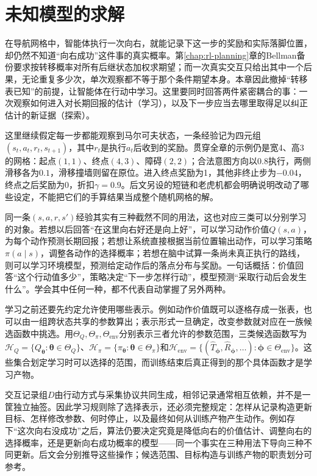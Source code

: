 \chapter{未知模型的求解}
\label{chap:rl-learning}

在导航网格中，智能体执行一次向右，就能记录下这一步的奖励和实际落脚位置，却仍然不知道“向右成功”这件事的真实概率。第\ref{chap:rl-planning}章的Bellman备份要求按转移概率对所有后继状态加权求期望；而一次真实交互只给出其中一个后果，无论重复多少次，单次观察都不等于那个条件期望本身。本章因此撤掉“转移表已知”的前提，让智能体在行动中学习。这里要同时回答两件紧密耦合的事：一次观察如何进入对长期回报的估计（学习），以及下一步应当去哪里取得足以纠正估计的新证据（探索）。

这里继续假定每一步都能观察到马尔可夫状态，一条经验记为四元组
$(s_t,a_t,r_t,s_{t+1})$，其中$r_t$是执行$a_t$后收到的奖励。贯穿全章的示例仍是宽4、高3的网格：起点$(1,1)$、终点$(4,3)$、障碍$(2,2)$；合法意图方向以$0.8$执行，两侧滑移各为$0.1$，滑移撞墙则留在原位。进入终点奖励为1，其他非终止步为$-0.04$，终点之后奖励为0，折扣$\gamma=0.9$。后文另设的短链和老虎机都会明确说明改动了哪些设定，不能把它们的手算结果当成整个随机网格的解。

同一条$(s,a,r,s')$经验其实有三种截然不同的用法，这也对应三类可以分别学习的对象。若想以后回答“在这里向右好还是向上好”，可以学习动作价值$Q(s,a)$，为每个动作预测长期回报；若想让系统直接根据当前位置输出动作，可以学习策略$\pi(a\mid s)$，调整各动作的选择概率；若想在脑中试算一条尚未真正执行的路线，则可以学习环境模型，预测给定动作后的落点分布与奖励。一句话概括：价值回答“这个行动值多少”，策略决定“下一步怎样行动”，模型预测“采取行动后会发生什么”。学会其中任何一种，都不代表自动掌握了另外两种。

学习之前还要先约定允许使用哪些表示。例如动作价值既可以逐格存成一张表，也可以由一组跨状态共享的参数算出；表示形式一旦确定，改变参数就对应在一族候选函数中挑选。用$\Theta_Q,\Theta_\pi,\Theta_{\mathrm{env}}$分别表示三者允许的参数范围，三类候选函数写为$\mathcal H_Q=\{Q_{\bm\theta}:\bm\theta\in\Theta_Q\}$、$\mathcal H_\pi=\{\pi_{\bm\theta}:\bm\theta\in\Theta_\pi\}$和$\mathcal H_{\mathrm{env}}=\{(\widehat T_{\bm\phi},\widehat R_{\bm\phi},\ldots):\bm\phi\in\Theta_{\mathrm{env}}\}$。这些集合划定学习时可以选择的范围，而训练结束后真正得到的那个具体函数才是学习产物。

交互记录组$D$由行动方式与采集协议共同生成，相邻记录通常相互依赖，并不是一筐独立抽签。因此学习规则除了选择表示，还必须完整规定：怎样从记录构造更新目标、怎样修改参数、何时停止，以及最终如何从训练产物产生动作。例如存下“这次向右没成功”之后，算法仍要决定究竟是降低向右的价值估计、调整向右的选择概率，还是更新向右成功概率的模型——同一个事实在三种用法下导向三种不同更新。后文会分别推导这些操作；候选范围、目标构造与训练产物的职责划分可参考。

